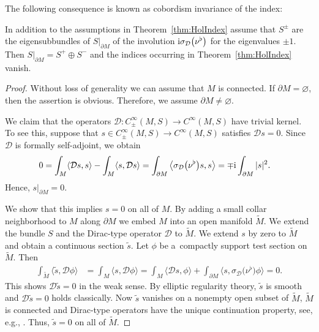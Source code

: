 The following consequence is known as cobordism invariance of the index:

\begin{Corollary}\label{cor:CobInv}
In addition to the assumptions in Theorem~{\rm\ref{thm:HolIndex}} assume that $S^\pm$ are the eigensubbundles of $S|_{\partial M}$ of the involution ${\rm i}\sigma_{\mathcal{D}}\big(\nu^\flat\big)$ for the eigenvalues $\pm 1$.
Then $S|_{\partial M} = S^+ \oplus S^-$ and the indices occurring in Theorem~{\rm\ref{thm:HolIndex}} vanish.
\end{Corollary}

\begin{proof}
Without loss of generality we can assume that $M$ is connected.
If $\partial M=\varnothing$, then the assertion is obvious.
Therefore, we assume $\partial M\neq \varnothing$.

We claim that the operators $\mathcal{D}\colon C^\infty_\pm(M,S)\to C^\infty(M,S)$ have trivial kernel.
To see this, suppose that $s\in C^\infty_\pm(M,S)\to C^\infty(M,S)$ satisfies $\mathcal{D}s=0$.
Since $\mathcal{D}$ is formally self-adjoint, we obtain
\begin{align*}
0
&=
\int_M \langle \mathcal{D}s,s\rangle - \int_M \langle s, \mathcal{D}s\rangle
=
\int_{\partial M} \big\langle \sigma_{\mathcal{D}}\big(\nu^\flat\big)s,s\big\rangle
=
\mp {\rm i}\int_{\partial M} |s|^2 .
\end{align*}
Hence, $s|_{\partial M}=0$.

We show that this implies $s=0$ on all of $M$.
By adding a small collar neighborhood to $M$ along $\partial M$ we embed $M$ into an open manifold $\tilde M$.
We extend the bundle $S$ and the Dirac-type operator $\mathcal{D}$ to $\tilde M$.
We extend $s$ by zero to $\tilde M$ and obtain a continuous section $\tilde s$.
Let $\phi$ be a~compactly support test section on $\tilde M$.
Then
\begin{align*}
\int_{\tilde M}\langle \tilde s,\mathcal{D}\phi\rangle
&=
\int_M\langle s,\mathcal{D}\phi\rangle
=
\int_M\langle \mathcal{D}s,\phi\rangle + \int_{\partial M} \big\langle s,\sigma_{\mathcal{D}}\big(\nu^\flat\big)\phi\big\rangle
=
0.
\end{align*}
This shows $\mathcal{D}\tilde s=0$ in the weak sense.
By elliptic regularity theory, $\tilde s$ is smooth and $\mathcal{D}\tilde s=0$ holds classically.
Now $\tilde s$ vanishes on a nonempty open subset of $\tilde M$, $\tilde M$ is connected and Dirac-type operators have the unique continuation property, see, e.g., \cite[Theorem~8.2]{Booss-Wojciechowski}.
Thus, $\tilde s=0$ on all of $\tilde M$.
\end{proof}

